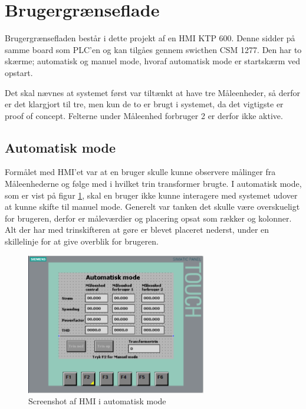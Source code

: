 
\section{Brugergrænseflade}
\label{sec:HMI}

Brugergrænsefladen består i dette projekt af en HMI KTP 600. Denne sidder på samme board som PLC'en og kan tilgåes gennem swicthen CSM 1277. Den har to skærme; automatisk og manuel mode, hvoraf automatisk mode er startskærm ved opstart.


Det skal nævnes at systemet først var tiltænkt at have tre Måleenheder, så derfor er det klargjort til tre, men kun de to er brugt i systemet, da det vigtigste er proof of concept. Felterne under Måleenhed forbruger 2 er derfor ikke aktive.

\subsection{Automatisk mode}

Formålet med HMI'et var at en bruger skulle kunne observere målinger fra Måleenhederne og følge med i hvilket trin transformer brugte. I automatisk mode, som er vist på figur \ref{fig:HMIAutomatiskModeDesign}, skal en bruger ikke kunne interagere med systemet udover at kunne skifte til manuel mode.
Generelt var tanken det skulle være overskueligt for brugeren, derfor er måleværdier og placering opsat som rækker og kolonner. Alt der har med trinskifteren at gøre er blevet placeret nederst, under en skillelinje for at give overblik for brugeren.

\begin{figure}[H] %
	\centering
	\includegraphics[width=0.7\textwidth]{Figure/HMIAutomatiskModeDesign}
	\caption{Screenshot af HMI i automatisk mode}
	\label{fig:HMIAutomatiskModeDesign}
\end{figure}

